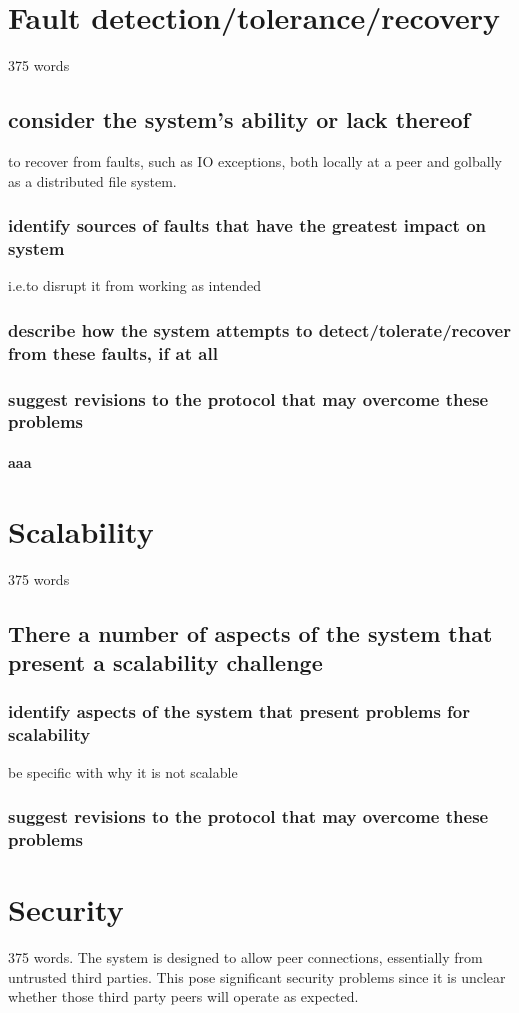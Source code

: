 \documentclass[10pt,a4paper]{report}
\begin{document}
\chapter{Fault detection/tolerance/recovery}
375 words
\section{consider the system's ability or lack thereof}
to recover from faults, such as IO exceptions, both locally at a peer and golbally as a distributed file system.

\subsection{identify sources of faults that have the greatest impact on system}
i.e.to disrupt it from working as intended
\subsection{describe how the system attempts to detect/tolerate/recover from these faults, if at all}
\subsection{suggest revisions to the protocol that may overcome these problems}
\subsubsection{aaa}

\chapter{Scalability}
375 words
\section{There a number of aspects of the system that present a scalability challenge}
\subsection{identify aspects of the system that present problems for scalability}
be specific with why it is not scalable
\subsection{suggest revisions to the protocol that may overcome these problems}
\chapter{Security}
375 words. The system is designed to allow peer connections, essentially from untrusted third parties. This pose significant security problems since it is unclear whether those third party peers will operate as expected.
\end{document}
